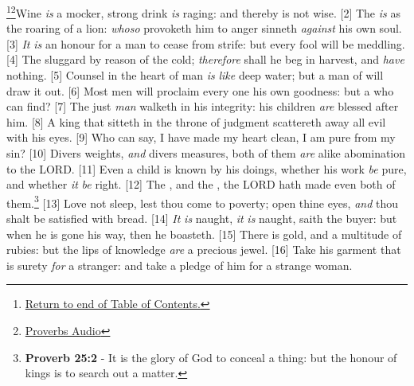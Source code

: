 \footnote{\textcolor[cmyk]{0.99998,1,0,0}{\hyperlink{TOC}{Return to end of Table of Contents.}}}\footnote{\href{https://www.audioverse.org/english/audiobibles/books/ENGKJV/O/Prov/1}{\textcolor[cmyk]{0.99998,1,0,0}{Proverbs Audio}}}\textcolor[cmyk]{0.99998,1,0,0}{Wine \emph{is} a mocker, strong drink \emph{is} raging: and  thereby is not wise.}
[2] \textcolor[cmyk]{0.99998,1,0,0}{The  \emph{is} as the roaring of a lion: \emph{whoso} provoketh him to anger sinneth \emph{against} his own soul.}
[3] \textcolor[cmyk]{0.99998,1,0,0}{\emph{It} \emph{is} an honour for a man to cease from strife: but every fool will be meddling.}
[4] \textcolor[cmyk]{0.99998,1,0,0}{The sluggard  by reason of the cold; \emph{therefore} shall he beg in harvest, and \emph{have} nothing.}
[5] \textcolor[cmyk]{0.99998,1,0,0}{Counsel in the heart of man \emph{is} \emph{like} deep water; but a man of  will draw it out.}
[6] \textcolor[cmyk]{0.99998,1,0,0}{Most men will proclaim every one his own goodness: but a  who can find?}
[7] \textcolor[cmyk]{0.99998,1,0,0}{The just \emph{man} walketh in his integrity: his children \emph{are} blessed after him.}
[8] \textcolor[cmyk]{0.99998,1,0,0}{A king that sitteth in the throne of judgment scattereth away all evil with his eyes.}
[9] \textcolor[cmyk]{0.99998,1,0,0}{Who can say, I have made my heart clean, I am pure from my sin?}
[10] \textcolor[cmyk]{0.99998,1,0,0}{Divers weights, \emph{and} divers measures, both of them \emph{are} alike abomination to the LORD.}
[11] \textcolor[cmyk]{0.99998,1,0,0}{Even a child is known by his doings, whether his work \emph{be} pure, and whether \emph{it} \emph{be} right.}
[12] \textcolor[cmyk]{0.99998,1,0,0}{The , and the , the LORD hath made even both of them.}\footnote{\textbf{Proverb 25:2} - It is the glory of God to conceal a thing: but the honour of kings is to search out a matter.}
[13] \textcolor[cmyk]{0.99998,1,0,0}{Love not sleep, lest thou come to poverty; open thine eyes, \emph{and} thou shalt be satisfied with bread.}
[14] \textcolor[cmyk]{0.99998,1,0,0}{\emph{It} \emph{is} naught, \emph{it} \emph{is} naught, saith the buyer: but when he is gone his way, then he boasteth.}
[15] \textcolor[cmyk]{0.99998,1,0,0}{There is gold, and a multitude of rubies: but the lips of knowledge \emph{are} a precious jewel.}
[16] \textcolor[cmyk]{0.99998,1,0,0}{Take his garment that is surety \emph{for} a stranger: and take a pledge of him for a strange woman.}

